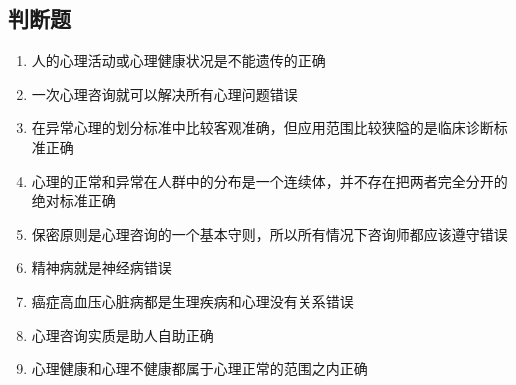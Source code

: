 \documentclass{article}
\begin{document}
	\subsection*{判断题}
	\begin{enumerate}
		\item 人的心理活动或心理健康状况是不能遗传的\hfill 正确
		
		\item 一次心理咨询就可以解决所有心理问题\hfill 错误
		
		\item 在异常心理的划分标准中比较客观准确，但应用范围比较狭隘的是临床诊断标准\hfill 正确

		\item 心理的正常和异常在人群中的分布是一个连续体，并不存在把两者完全分开的绝对标准\hfill 正确

		\item 保密原则是心理咨询的一个基本守则，所以所有情况下咨询师都应该遵守\hfill 错误

		\item 精神病就是神经病\hfill 错误

		\item 癌症高血压心脏病都是生理疾病和心理没有关系\hfill 错误

		\item 心理咨询实质是助人自助\hfill 正确

		\item 心理健康和心理不健康都属于心理正常的范围之内\hfill 正确

	\end{enumerate}
\end{document}
